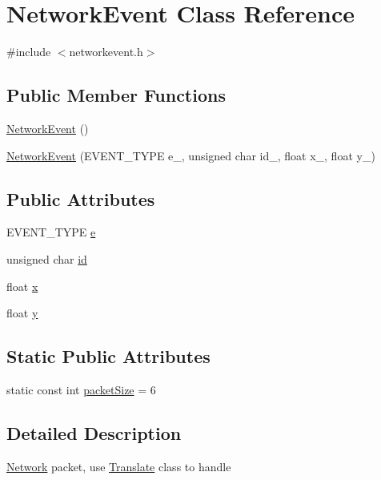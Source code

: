 \hypertarget{class_network_event}{\section{Network\-Event Class Reference}
\label{class_network_event}
}


{\ttfamily \#include $<$networkevent.\-h$>$}

\subsection*{Public Member Functions}
\begin{DoxyCompactItemize}
\item 
\hyperlink{class_network_event_a6bcc9b872bba17dfd2923b66c42a2817}{Network\-Event} ()
\item 
\hyperlink{class_network_event_a81675f3074664bf4febfe56174d661ff}{Network\-Event} (E\-V\-E\-N\-T\-\_\-\-T\-Y\-P\-E e\-\_\-, unsigned char id\-\_\-, float x\-\_\-, float y\-\_\-)
\end{DoxyCompactItemize}
\subsection*{Public Attributes}
\begin{DoxyCompactItemize}
\item 
E\-V\-E\-N\-T\-\_\-\-T\-Y\-P\-E \hyperlink{class_network_event_a0f46f7a2c2876d3af113b5b50df06426}{e}
\item 
unsigned char \hyperlink{class_network_event_ac223ce8828eba29110147ed7a5a7d76b}{id}
\item 
float \hyperlink{class_network_event_ab847bb49581f345b762ba702fe41d505}{x}
\item 
float \hyperlink{class_network_event_ac12a2de372b8b3604b0f862a7e56e7dc}{y}
\end{DoxyCompactItemize}
\subsection*{Static Public Attributes}
\begin{DoxyCompactItemize}
\item 
static const int \hyperlink{class_network_event_a174f204e98eb4fd4fb442b9166208986}{packet\-Size} = 6
\end{DoxyCompactItemize}


\subsection{Detailed Description}
\hyperlink{class_network}{Network} packet, use \hyperlink{class_translate}{Translate} class to handle 

